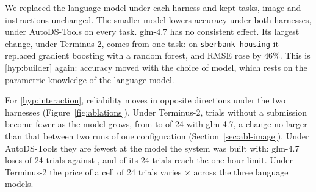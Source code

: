We replaced the language model under each harness and kept tasks, image and
instructions unchanged. The smaller model lowers accuracy under both
harnesses, under AutoDS-Tools on every task. glm-4.7 has no consistent
effect. Its largest change, under Terminus-2, comes from one task: on
\texttt{sberbank-housing} it replaced gradient boosting with a random forest,
and RMSE rose by $46\%$. This is \ref{hyp:builder} again: accuracy moved
with the choice of model, which rests on the parametric knowledge of the
language model.

For \ref{hyp:interaction}, reliability moves in opposite directions under the
two harnesses (Figure~\ref{fig:ablations}). Under Terminus-2, trials without
a submission become fewer as the model grows, from \axTerminusRefLost{} to
\axTerminusBigLost{} of 24 with glm-4.7, a change no larger than that between
two runs of one configuration (Section~\ref{sec:abl-image}). Under
AutoDS-Tools they are fewest at the model the system was built with:
glm-4.7 loses \axAutoDSBigLost{} of 24 trials against \axAutoDSRefLost{},
and \axAutoDSBigCut{} of its 24 trials reach the one-hour limit. Under Terminus-2 the price of a
cell of 24 trials varies \axPriceSpread$\times$ across the three language
models.

